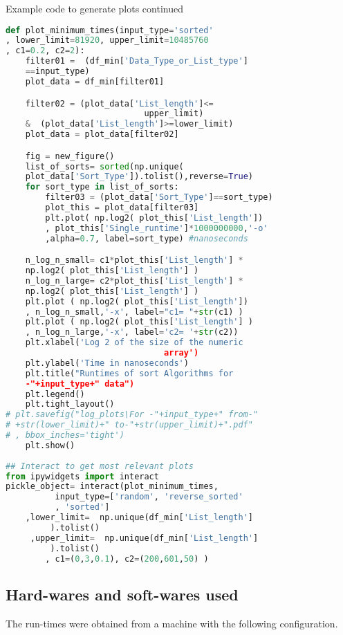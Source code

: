 \documentclass[sigconf, nonacm, natbib, screen, balance=False]{acmart}
\begin{document}
\begin{listing}
  \caption{Example code to generate plots continued}
  \label{plot function02}
\begin{lstlisting}[language=Python]
def plot_minimum_times(input_type='sorted'
, lower_limit=81920, upper_limit=10485760
, c1=0.2, c2=2):
    filter01 =  (df_min['Data_Type_or_List_type']
    ==input_type)
    plot_data = df_min[filter01]

    filter02 = (plot_data['List_length']<=
                            upper_limit) 
    &  (plot_data['List_length']>=lower_limit)
    plot_data = plot_data[filter02]

    fig = new_figure()
    list_of_sorts= sorted(np.unique(
    plot_data['Sort_Type']).tolist(),reverse=True)
    for sort_type in list_of_sorts:
        filter03 = (plot_data['Sort_Type']==sort_type)
        plot_this = plot_data[filter03]         
        plt.plot( np.log2( plot_this['List_length']) 
        , plot_this['Single_runtime']*1000000000,'-o' 
        ,alpha=0.7, label=sort_type) #nanoseconds

    n_log_n_small= c1*plot_this['List_length'] *
    np.log2( plot_this['List_length'] )
    n_log_n_large= c2*plot_this['List_length'] *
    np.log2( plot_this['List_length'] )
    plt.plot ( np.log2( plot_this['List_length']) 
    , n_log_n_small,'-x', label="c1= "+str(c1) )
    plt.plot ( np.log2( plot_this['List_length'] )
    , n_log_n_large,'-x', label='c2= '+str(c2))
    plt.xlabel('Log 2 of the size of the numeric 
                                array')
    plt.ylabel('Time in nanoseconds')
    plt.title("Runtimes of sort Algorithms for 
    -"+input_type+" data")
    plt.legend()
    plt.tight_layout()
# plt.savefig("log_plots\For -"+input_type+" from-"
# +str(lower_limit)+" to-"+str(upper_limit)+".pdf"
# , bbox_inches='tight')
    plt.show()
    
## Interact to get most relevant plots
from ipywidgets import interact 
pickle_object= interact(plot_minimum_times,
          input_type=['random', 'reverse_sorted'
          , 'sorted']
    ,lower_limit=  np.unique(df_min['List_length']
         ).tolist() 
     ,upper_limit=  np.unique(df_min['List_length']
         ).tolist()
        , c1=(0,3,0.1), c2=(200,601,50) )
\end{lstlisting}
\end{listing}


\subsection{Hard-wares and soft-wares used}\label{sec:hardwares and softwares}
The run-times were obtained from a machine with the following configuration. 
\end{document}
